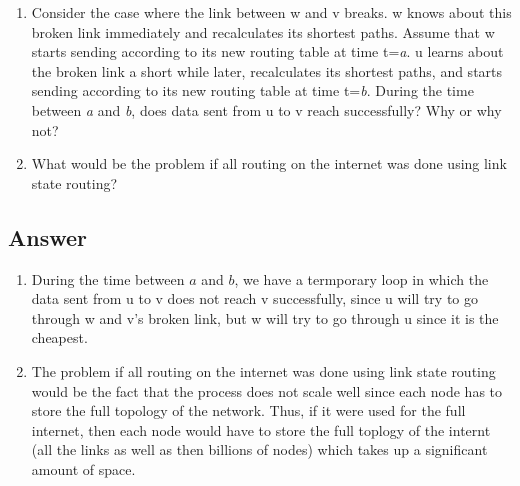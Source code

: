 \documentclass[10pt]{article}
\newenvironment{problem}[2][Problem]{\begin{trivlist}
\item[\hskip \labelsep {\bfseries #1}\hskip \labelsep {\bfseries #2.}]}{\end{trivlist}}
\begin{document}
\begin{problem}{2: Link State Routing}
\begin{enumerate}
\begin{table}[ht]
\begin{center}
\begin{tabular}{|p{1.5cm}|p{1.5cm}|p{1.5cm}|p{1cm}|p{1cm}|p{1cm}|p{1cm}|p{1cm}|}
\end{tabular}
\end{center}
\label{tab:multicol}
\end{table}
\item Consider the case where the link between w and v breaks. w knows about this broken link immediately and recalculates its shortest paths. Assume that w starts sending according to its new routing table at time t=\emph{a}. u learns about the broken link a short while later, recalculates its shortest paths, and starts sending according to its new routing table at time t=\emph{b}. During the time between \emph{a} and \emph{b}, does data sent from u to v reach successfully? Why or why not?

\item What would be the problem if all routing on the internet was done using link state routing?
\end{enumerate}
\end{problem}

\subsection*{Answer}
\begin{enumerate}
	\item[2.] During the time between $a$ and $b$, we have a termporary loop in which the data sent from u to v does not reach v successfully, since u will try to go through w and v's broken link, but w will try to go through u since it is the cheapest.
	\item[3.] The problem if all routing on the internet was done using link state routing would be the fact that the process does not scale well since each node has to store the full topology of the network. Thus, if it were used for the full internet, then each node would have to store the full toplogy of the internt (all the links as well as then billions of nodes) which takes up a significant amount of space. 
\end{enumerate}
\end{document}
